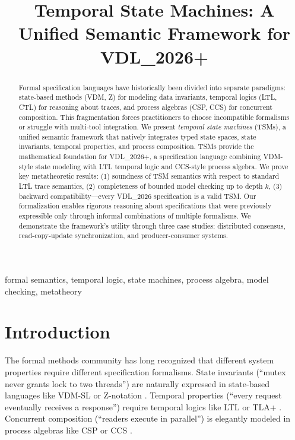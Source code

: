 \documentclass[conference]{IEEEtran}
\begin{document}
\title{Temporal State Machines: A Unified Semantic Framework for VDL\_2026+}

\author{
}

\maketitle

\begin{abstract}
Formal specification languages have historically been divided into separate paradigms: state-based methods (VDM, Z) for modeling data invariants, temporal logics (LTL, CTL) for reasoning about traces, and process algebras (CSP, CCS) for concurrent composition. This fragmentation forces practitioners to choose incompatible formalisms or struggle with multi-tool integration. We present \textit{temporal state machines} (TSMs), a unified semantic framework that natively integrates typed state spaces, state invariants, temporal properties, and process composition. TSMs provide the mathematical foundation for VDL\_2026+, a specification language combining VDM-style state modeling with LTL temporal logic and CCS-style process algebra. We prove key metatheoretic results: (1) soundness of TSM semantics with respect to standard LTL trace semantics, (2) completeness of bounded model checking up to depth $k$, (3) backward compatibility—every VDL\_2026 specification is a valid TSM. Our formalization enables rigorous reasoning about specifications that were previously expressible only through informal combinations of multiple formalisms. We demonstrate the framework's utility through three case studies: distributed consensus, read-copy-update synchronization, and producer-consumer systems.
\end{abstract}

\begin{IEEEkeywords}
formal semantics, temporal logic, state machines, process algebra, model checking, metatheory
\end{IEEEkeywords}

\section{Introduction}

The formal methods community has long recognized that different system properties require different specification formalisms. State invariants (``mutex never grants lock to two threads'') are naturally expressed in state-based languages like VDM-SL \cite{jones1990} or Z-notation \cite{spivey1989}. Temporal properties (``every request eventually receives a response'') require temporal logics like LTL \cite{pnueli1977} or TLA+ \cite{lamport2002}. Concurrent composition (``readers execute in parallel'') is elegantly modeled in process algebras like CSP \cite{hoare1985} or CCS \cite{milner1989}.
\end{document}
